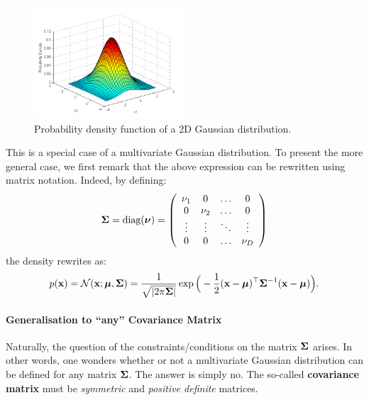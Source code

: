\begin{figure}[H]
 \centering
 \includegraphics[width=0.5\textwidth]{fig/multivariate_gaussian}
 \caption{Probability density function of a 2D Gaussian distribution.}
 \label{fig:pdf-2d-Gaussian}
\end{figure}


This is a special case of a multivariate Gaussian distribution. To present the more general case, we first remark that the above expression can be rewritten using matrix notation. Indeed, by defining:
\begin{equation}
    \boldsymbol{\mathbf{\Sigma}}=\textrm{diag}(\boldsymbol{\nu})=\left(\begin{array}{cccc}
    \nu_1 & 0 & \ldots & 0 \\
    0 & \nu_2 & \ldots & 0 \\
    \vdots & \vdots & \ddots & \vdots \\
    0 & 0 & \ldots & \nu_D
    \end{array}\right)
\end{equation}
the density rewrites as:
\begin{equation}
    p(\mathbf{x}) = \mathcal{N}(\mathbf{x};\boldsymbol{\mathbf{\mu}},\boldsymbol{\mathbf{\Sigma}}) = \frac{1}{\sqrt{|2\pi\boldsymbol{\mathbf{\Sigma}}|}}\exp\Big(-\frac{1}{2}(\boldsymbol{\mathbf{x}}-\boldsymbol{\mathbf{\mu}})^\top\boldsymbol{\mathbf{\Sigma}}^{-1}(\boldsymbol{\mathbf{x}}-\boldsymbol{\mathbf{\mu}})\Big).
\end{equation}
 
\paragraph{Generalisation to ``any'' Covariance Matrix} Naturally, the question of the constraints/conditions on the matrix $\boldsymbol{\mathbf{\Sigma}}$ arises. In other words, one wonders whether or not a multivariate Gaussian distribution can be defined for any matrix $\boldsymbol{\mathbf{\Sigma}}$. The answer is simply no. The so-called \textbf{covariance matrix} must be  \textit{symmetric} and \textit{positive definite} matrices.\vspace{2mm}
 

